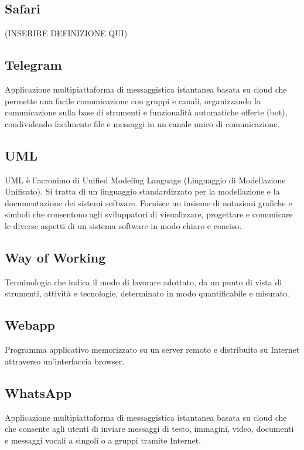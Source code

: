 \subsection{Safari} (INSERIRE DEFINIZIONE QUI)
\subsection{Telegram}Applicazione multipiattaforma di messaggistica istantanea basata su cloud che permette una facile comunicazione con gruppi e canali, organizzando la comunicazione sulla base di strumenti e funzionalità automatiche offerte (bot), condividendo facilmente file e messaggi in un canale unico di comunicazione.
\subsection{UML}UML è l'acronimo di Unified Modeling Language (Linguaggio di Modellazione Unificato). Si tratta di un linguaggio standardizzato per la modellazione e la documentazione dei sistemi software. Fornisce un insieme di notazioni grafiche e simboli che consentono agli sviluppatori di visualizzare, progettare e comunicare le diverse aspetti di un sistema software in modo chiaro e conciso.
\subsection{Way of Working}Terminologia che indica il modo di lavorare adottato, da un punto di vista di strumenti, attività e tecnologie, determinato in modo quantificabile e misurato.
\subsection{Webapp}Programma applicativo memorizzato su un server remoto e distribuito su Internet attraverso un'interfaccia browser.
\subsection{WhatsApp}Applicazione multipiattaforma di messaggistica istantanea basata su cloud che che consente agli utenti di inviare messaggi di testo, immagini, video, documenti e messaggi vocali a singoli o a gruppi tramite Internet.
